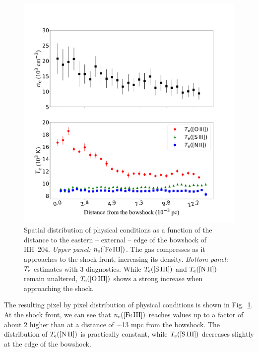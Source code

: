 \documentclass[twocolumn,linenumbers]{aastex63}
\begin{document}
\begin{figure}
\centering
\includegraphics[width=\columnwidth]{physical_conditions.pdf}
\caption{Spatial distribution of physical conditions as a function of the distance to the eastern -- external -- edge of the bowshock of HH~204. \textit{Upper panel:} $n_{\rm e}(\text{[Fe\thinspace III]})$. The gas compresses as it approaches to the shock front, increasing its density. \textit{Bottom panel:} $T_{\rm e}$ estimates with 3 diagnostics. While $T_{\rm e}(\text{[S\thinspace III]})$ and $T_{\rm e}(\text{[N\thinspace II]})$ remain unaltered, $T_{\rm e}(\text{[O\thinspace III]})$ shows a strong increase when approaching the shock. }
\label{fig:small_scale_physical_conditions}
\end{figure}



The resulting pixel by pixel distribution of physical conditions is shown in Fig.~\ref{fig:small_scale_physical_conditions}. At the shock front, we can see that $n_{\rm e}\text{([Fe\thinspace III])}$ reaches values up to a factor of about 2 higher than at a distance of $\sim$13$ \text{ mpc}$ from the bowshock. The distribution of $T_{\rm e}(\text{[N\thinspace II]})$ is practically constant, while $T_{\rm e}(\text{[S\thinspace III]})$ decreases slightly at the edge of the bowshock. 
\end{document}
